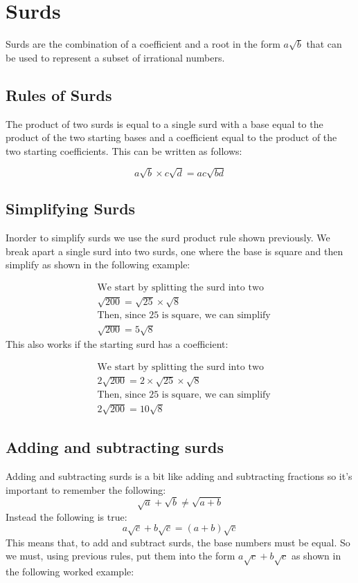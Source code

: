 \documentclass{article}
\begin{document}
\section{Surds}
Surds are the combination of a coefficient and a root in the form $a\sqrt{b}$ that can be used to 
represent a subset of irrational numbers.

\subsection{Rules of Surds}
The product of two surds is equal to a single surd with a base equal to the product of the two starting bases and
a coefficient equal to the product of the two starting coefficients. This can be written as follows:

\begin{equation}
	a\sqrt{b} \times c\sqrt{d} = ac\sqrt{bd}
\end{equation}

\subsection{Simplifying Surds}

Inorder to simplify surds we use the surd product rule shown previously. We break apart a single surd into two surds,
one where the base is square and then simplify as shown in the following example:

\begin{align*}
	&\text{We start by splitting the surd into two}\\
	&\sqrt{200} = \sqrt{25} \times \sqrt{8}\\
	&\text{Then, since $25$ is square, we can simplify} \\
	&\sqrt{200} = 5\sqrt{8}
\end{align*}
This also works if the starting surd has a coefficient:


\begin{align*}
	&\text{We start by splitting the surd into two}\\
	&2\sqrt{200} = 2 \times \sqrt{25} \times \sqrt{8}\\
	&\text{Then, since $25$ is square, we can simplify} \\
	&2\sqrt{200} = 10\sqrt{8}
\end{align*}
\subsection{Adding and subtracting surds}
Adding and subtracting surds is a bit like adding and subtracting fractions so it's important to remember the following:
\begin{equation}
	\sqrt{a} + \sqrt{b} \ne \sqrt{a + b}
\end{equation}
Instead the following is true:
\begin{equation}
	a\sqrt{c} + b\sqrt{c} = (a + b)\sqrt{c}
\end{equation}
This means that, to add and subtract surds, the base numbers must be equal. So we must, using previous rules,
put them into the form $a\sqrt{c} + b\sqrt{c}$ as shown in the following worked example:
\end{document}
